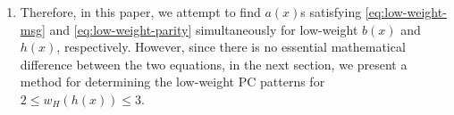 \begin{enumerate}
\item Therefore, in this paper, we attempt to find $a(x)$s satisfying  \eqref{eq:low-weight-msg} and  \eqref{eq:low-weight-parity} simultaneously for low-weight $b(x)$ and $h(x)$, respectively. 
%
However, since there is no essential mathematical difference between the two equations, in the next section, we present a method for determining the low-weight PC patterns for $2 \leq w_H(h(x)) \leq 3$.
\end{enumerate}


